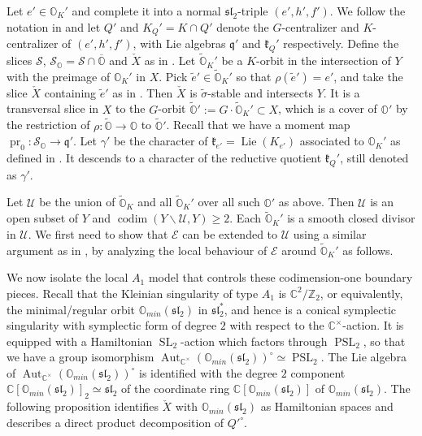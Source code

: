 \documentclass[11pt, a4paper]{amsart}
\newcommand{\C}{\mathbb{C}}
\newcommand{\orb}{\mathbb{O}}
\newcommand{\orbk}{\orb_{K}}
\newcommand{\torbk}{\widetilde{\orb}_{K}}
\newcommand{\Z}{\mathbb{Z}}
\newcommand{\fk}{\mathfrak{k}}
\newcommand{\fq}{\mathfrak{q}}
\newcommand{\cS}{\mathcal{S}}
\newcommand{\cE}{\mathcal{E}}
\newcommand{\cU}{\mathcal{U}}
\DeclareMathOperator{\Lie}{Lie}
\DeclareMathOperator{\codim}{codim}
\newcommand{\SL}{\operatorname{SL}}
\newcommand{\pr}{\operatorname{pr}}
\newcommand{\cm}{\C^\times}
\newcommand{\slf}{\mathfrak{sl}}
\newcommand{\PSL}{\operatorname{PSL}}
\newcommand{\aut}{{\operatorname{Aut}}}
\theoremstyle{definition}
\numberwithin{equation}{section}
\begin{document}
Let $e' \in \orbk'$ and complete it into a normal $\slf_2$-triple $(e',h',f')$. We follow the notation in  and let $Q'$ and $K_Q' = K \cap Q'$ denote the $G$-centralizer and $K$-centralizer of $(e',h',f')$, with Lie algebras $\fq'$ and $\fk_Q'$ respectively. Define the slices $\cS$, $\cS_\orb = \cS \cap \overline{\orb}$ and $\check{X}$ as in .
Let $\torbk'$ be a $K$-orbit in the intersection of $Y$ with the preimage of $\orbk'$ in $X$. 
Pick $\tilde{e}' \in \torbk'$ so that $\rho(\tilde{e}')=e'$, and take the slice $\check{X}$ containing $\tilde{e}'$ as in . Then $\check{X}$ is $\tilde{\sigma}$-stable and intersects $Y$. It is a transversal slice in $X$ to the $G$-orbit $\widetilde{\orb}' := G \cdot \torbk' \subset X$, which is a cover of $\orb'$ by the restriction of $\rho: \widetilde{\orb} \to \orb$ to $\widetilde{\orb}'$. Recall that we have a moment map $\pr_0: \cS_\orb \to \mathfrak{q}'$. Let $\gamma'$ be the character of $\fk_{e'} = \Lie(K_{e'})$ associated to $\orbk'$ as defined in . It descends to a character of the reductive quotient $\fk_Q'$, still denoted as $\gamma'$.

Let $\cU$ be the union of $\torbk$ and all $\torbk'$ over all such $\orb'$ as above. Then $\cU$ is an open subset of $Y$ and $\codim(Y \backslash \cU, Y) \geqslant 2$. Each $\torbk'$ is a smooth closed divisor in $\cU$. We first need to show that $\cE$ can be extended to $\cU$ using a similar argument as in \cite[Appendix]{LosevYu}, by analyzing the local behaviour of $\cE$ around $\torbk'$ as follows.

We now isolate the local $A_1$ model that controls these codimension-one boundary pieces.
Recall that the Kleinian singularity of type $A_1$ is $\C^2/\Z_2$, or equivalently, the minimal/regular orbit $\orb_{min}(\slf_2)$ in $\slf_2^*$, and hence is a conical symplectic singularity with symplectic form of degree $2$ with respect to the $\cm$-action. It is equipped with a Hamiltonian $\SL_2$-action which factors through $\PSL_2$, so that we have a group isomorphism $\aut_{\cm}(\orb_{min}(\slf_2))^\circ \simeq \PSL_2$. The Lie algebra of $\aut_{\cm}(\orb_{min}(\slf_2))^\circ$ is identified with the degree $2$ component $\C[\orb_{min}(\slf_2)]_2 \simeq \slf_2$ of the coordinate ring $\C[\orb_{min}(\slf_2)]$ of $\orb_{min}(\slf_2)$.
The following proposition identifies $\check{X}$ with $\orb_{min}(\slf_2)$ as Hamiltonian spaces and describes a direct product decomposition of $Q'^\circ$.
\end{document}
